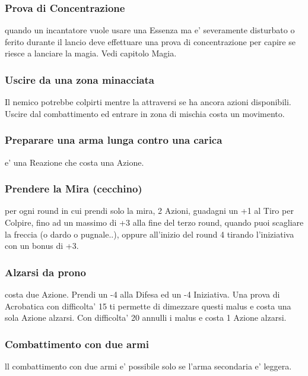 \documentclass[a4paper,11pt,twoside,openany]{book}
\begin{document}
\subsubsection{Prova di Concentrazione} quando un incantatore vuole usare una Essenza ma e' severamente disturbato o ferito durante il lancio deve effettuare una prova di concentrazione per capire se riesce a lanciare la magia. Vedi capitolo Magia.

\subsubsection{Uscire da una zona minacciata} Il nemico potrebbe colpirti mentre la attraversi se ha ancora azioni disponibili. Uscire dal combattimento ed entrare in zona di mischia costa un movimento.

\subsubsection{Preparare una arma lunga contro una carica} e' una Reazione che costa una Azione.

\subsubsection{Prendere la Mira (cecchino)} per ogni round in cui prendi solo la mira, 2 Azioni, guadagni un +1 al Tiro per Colpire, fino ad un massimo di +3 alla fine del terzo round, quando puoi scagliare la freccia (o dardo o pugnale..), oppure all'inizio del round 4 tirando l'iniziativa con un bonus di +3.

\subsubsection{Alzarsi da prono} costa due Azione. Prendi un -4 alla Difesa ed un -4 Iniziativa. Una prova di Acrobatica con difficolta' 15 ti permette di dimezzare questi malus e costa una sola Azione alzarsi. Con difficolta' 20 annulli i malus e costa 1 Azione alzarsi.
	
\subsubsection{Combattimento con due armi} ll combattimento con due armi e' possibile solo se l'arma secondaria e' leggera.
\end{document}
